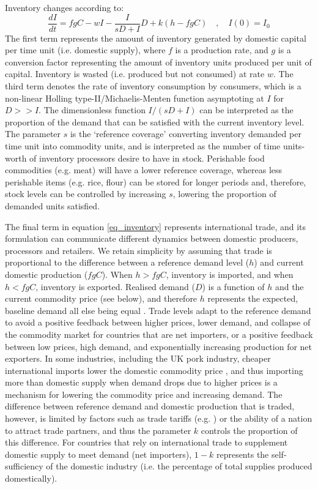 \documentclass[12pt]{article}
\begin{document}
Inventory changes according to:
%
\begin{equation}
  \frac{dI}{dt} = f g C - w I - \frac{I}{sD + I} D + k (h - f g C) \quad, \quad I(0) = I_0
  \label{eq_inventory}
\end{equation}
%
The first term represents the amount of inventory generated by domestic capital per time unit (i.e. domestic supply), where $f$ is a production rate, and $g$ is a conversion factor representing the amount of inventory units produced per unit of capital. Inventory is wasted (i.e. produced but not consumed) at rate $w$. The third term denotes the rate of inventory consumption by consumers, which is a non-linear Holling type-II/Michaelis-Menten function asymptoting at $I$ for $D >> I$. The dimensionless function $I/(sD + I)$ can be interpreted as the proportion of the demand that can be satisfied with the current inventory level. The parameter $s$ is the `reference coverage' converting inventory demanded per time unit into commodity units, and is interpreted as the number of time units-worth of inventory processors desire to have in stock. Perishable food commodities (e.g. meat) will have a lower reference coverage, whereas less perishable items (e.g. rice, flour) can be stored for longer periods and, therefore, stock levels can be controlled by increasing $s$, lowering the proportion of demanded units satisfied.

The final term in equation \ref{eq_inventory} represents international trade, and its formulation can communicate different dynamics between domestic producers, processors and retailers. We retain simplicity by assuming that trade is proportional to the difference between a reference demand level ($h$) and current domestic production ($f g C$). When $h > f g C$, inventory is imported, and when $h < f g C$, inventory is exported. Realised demand ($D$) is a function of $h$ and the current commodity price (see below), and therefore $h$ represents the expected, baseline demand all else being equal \cite{sterman2000}. Trade levels adapt to the reference demand to avoid a positive feedback between higher prices, lower demand, and collapse of the commodity market for countries that are net importers, or a positive feedback between low prices, high demand, and exponentially increasing production for net exporters. In some industries, including the UK pork industry, cheaper international imports lower the domestic commodity price \cite{AHDBeuroexhange2015}, and thus importing more than domestic supply when demand drops due to higher prices is a mechanism for lowering the commodity price and increasing demand. The difference between reference demand and domestic production that is traded, however, is limited by factors such as trade tariffs (e.g. \cite{feng2017}) or the ability of a nation to attract trade partners, and thus the parameter $k$ controls the proportion of this difference. For countries that rely on international trade to supplement domestic supply to meet demand (net importers), $1 - k$ represents the self-sufficiency of the domestic industry (i.e. the percentage of total supplies produced domestically).
\end{document}
